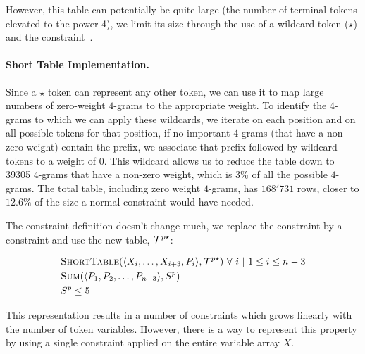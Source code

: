 \documentclass[../Document.tex]{subfiles}
\begin{document}
However, this table can potentially be quite large (the number of terminal tokens elevated to the power 4), we limit its size through the use of a wildcard token ($\star$) and the \shortTable constraint~\cite{DBLP:conf/aaai/VerhaegheLS17}.

\paragraph{Short Table Implementation.}
Since a $\star$ token can represent any other token, we can use it to map large numbers of zero-weight $4$-grams to the appropriate weight.
To identify the $4$-grams to which we can apply these wildcards, we iterate on each position and on all possible tokens for that position, if no important $4$-grams (that have a non-zero weight) contain the prefix, we associate that prefix followed by wildcard tokens to a weight of 0.
This wildcard allows us to reduce the table down to 39305 $4$-grams that have a non-zero weight, which is 3\% of all the possible $4$-grams. The total table, including zero weight $4$-grams, has $168'731$ rows, closer to $12.6\%$ of the size a normal \extensional constraint would have needed.

The constraint definition doesn't change much, we replace the \extensional constraint by a\\ \shortTable constraint and use the new table, ${\cal T}^{p\star}$:

\begin{align*}
    &\mbox{\sc ShortTable}(\langle X_i,\ldots,X_{i+3},P_i\rangle, {\cal T}^{p\star})\ \forall\ i\ \vert\ 1 \leq i \leq n-3 \\
    &\mbox{\sc Sum}(\langle P_1, P_2,\ldots,P_{n-3} \rangle, S^p)\\
    &S^p \leq 5
\end{align*}

This representation results in a number of constraints which grows linearly with the number of token variables. However, there is a way to represent this property by using a single \costregular constraint applied on the entire variable array $X$.



\end{document}
